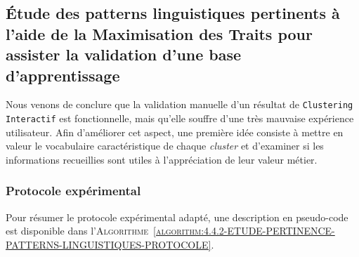 	
	\subsection{Étude des patterns linguistiques pertinents à l'aide de la Maximisation des Traits pour assister la validation d'une base d'apprentissage}
	\label{section:4.4.2-ETUDE-PERTINENCE-PATTERNS-LINGUISTIQUES}
		
		Nous venons de conclure que la validation manuelle d'un résultat de \texttt{Clustering Interactif} est fonctionnelle, mais qu'elle souffre d'une très mauvaise expérience utilisateur.
		Afin d'améliorer cet aspect, une première idée consiste à mettre en valeur le vocabulaire caractéristique de chaque \textit{cluster} et d'examiner si les informations recueillies sont utiles à l'appréciation de leur valeur métier.
	
		\subsubsection{Protocole expérimental}
			
			Pour résumer le protocole expérimental adapté, une description en pseudo-code est disponible dans l'\textsc{Algorithme~\ref{algorithm:4.4.2-ETUDE-PERTINENCE-PATTERNS-LINGUISTIQUES-PROTOCOLE}}.
			
